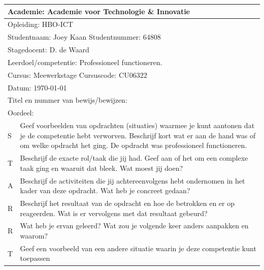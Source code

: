 \begin{tabularx}{\textwidth}{| l | X |}
\hline
\multicolumn{2}{|l|}{Academie: Academie voor Technologie \& Innovatie } \\
\hline
\multicolumn{2}{|l|}{Opleiding: HBO-ICT } \\
\hline
\multicolumn{2}{|l|}{Studentnaam: Joey Kaan \hspace{35pt} Studentnummer: 64808} \\
\hline
\multicolumn{2}{|l|}{Stagedocent: D. de Waard} \\
\hline
\multicolumn{2}{|p{\textwidth-1in}|}{Leerdoel/competentie: Professioneel functioneren.} \\
\hline
\multicolumn{2}{|l|}{Cursus: Meewerkstage \hspace{35pt} Cursuscode: CU06322} \\
\hline
\multicolumn{2}{|l|}{Datum: \today} \\
\hline
\multicolumn{2}{|l|}{Titel en nummer van bewijs/bewijzen: } \\ [50pt]
\hline
\multicolumn{2}{|l|}{Oordeel: } \\
\hline
S & Geef voorbeelden van opdrachten (situaties) waarmee je kunt aantonen dat je de competentie hebt verworven. Beschrijf kort wat er aan de hand was of om welke opdracht het ging.
\newline
\newline
De opdracht was professioneel functioneren. \\
\hline
T & Beschrijf de exacte rol/taak die jij had. Geef aan of het om een complexe taak ging en waaruit dat bleek. Wat moest jij doen?
\newline
\newline
\\
\hline
A & Beschrijf de activiteiten die jij achtereenvolgens hebt ondernomen in het kader van deze opdracht. Wat heb je concreet gedaan?
\newline
\newline
\\
\hline
R & Beschrijf het resultaat van de opdracht en hoe de betrokken en er op reageerden. Wat is er vervolgens met dat resultaat gebeurd?
\newline
\newline
\\
\hline
R & Wat heb je ervan geleerd? Wat zou je volgende keer anders aanpakken en waarom?
\newline
\newline
\\
\hline
T & Geef een voorbeeld van een andere situatie waarin je deze competentie kunt toepassen
\newline
\newline
\\
\hline
\end{tabularx}

